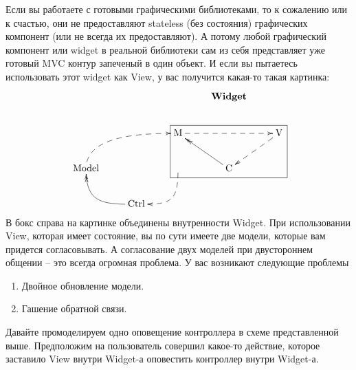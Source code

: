 Если вы работаете с готовыми графическими библиотеками, то к сожалению или к счастью, они не предоставляют stateless (без состояния) графических компонент (или не всегда их предоставляют).
А потому любой графический компонент или widget в реальной библиотеки сам из себя представляет уже готовый MVC контур запеченый в один объект.
И если вы пытаетесь использовать этот widget как View, у вас получится какая-то такая картинка:
\[
\xymatrix{
  {}&{}&{}&{\text{\textbf{Widget}}}&{}\\
  {}&{}&{\text{M}}\ar@{-->}[rr]
  {\save
  [].[rrd]*+[F-]\frm{}
  \restore
  }
  &{}&{\text{V}}\ar@{-->}[dl]\\
  {\text{Model}}\ar@{-->}@(u,l)[urr]&{}&{}\ar@{-->}@(d,r)[dl]&{\text{C}}\ar@{->>}[ul]&{}\\
  {}&{\text{Ctrl}}\ar@{->>}@(l,d)[ul]&{}&{}&{}\\
}
\]
В бокс справа на картинке объединены внутренности Widget.
При использовании View, которая имеет состояние, вы по сути имеете две модели, которые вам придется согласовывать.
А согласование двух моделей при двустороннем общении -- это всегда огромная проблема.
У вас возникают следующие проблемы
\begin{enumerate}
\item Двойное обновление модели.

\item Гашение обратной связи.
\end{enumerate}
Давайте промоделируем одно оповещение контроллера в схеме представленной выше.
Предположим на пользователь совершил какое-то действие, которое заставило View внутри Widget-а оповестить контроллер внутри Widget-а.
